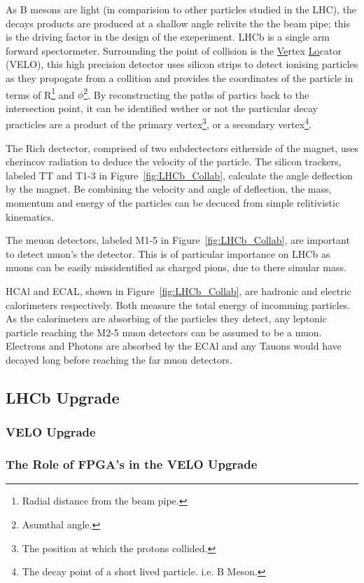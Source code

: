    As B mesons are light (in comparision to other particles studied in the LHC), the decays products are produced at a shallow angle relivite the the beam pipe;
    this is the driving factor in the design of the exeperiment. 
    LHCb is a single arm forward spectormeter.
    Surrounding the point of collision is the \underline{Ve}rtex \underline{Lo}cator (VELO), this high precision detector uses silicon strips to detect ionising particles as they propogate from a collition and provides the coordinates of the particle in terms of R\footnote{Radial distance from the beam pipe.} and $\phi$\footnote{Asumthal angle.}.
    By reconstructing the paths of partics back to the intersection point, it can be identified wether or not the particular decay practicles are a product of the primary vertex\footnote{The position at which the protons collided.}, or a secondary vertex\footnote{The decay point of a short lived particle. i.e. B Meson.}.
    \par
    The Rich dectector, comprised of two subdectectors eitherside of the magnet, uses cherincov radiation to deduce the velocity of the particle. The silicon trackers, labeled TT and T1-3 in Figure~\ref{fig:LHCb_Collab}, calculate the angle deflection by the magnet. Be combining the velocity and angle of deflection, the mass, momentum and energy of the particles can be decuced from simple relitivistic kinematics.
    \par
    The meuon detectors, labeled M1-5 in Figure~\ref{fig:LHCb_Collab}, are important to detect muon's the detector. 
    This is of particular importance on LHCb as muons can be easily missidentified as charged pions, due to there simular mass.
    \par
    HCAl and ECAL, shown in Figure~\ref{fig:LHCb_Collab}, are hadronic and electric calorimeters respectively. 
    Both measure the total energy of incomming particles.
    As the calorimeters are absorbing of the particles they detect, any leptonic particle reaching the M2-5 muon detectors can be assumed to be a muon.
    Electrons and Photons are absorbed by the ECAl and any Tauons would have decayed long before reaching the far muon detectors.

      \subsection{LHCb Upgrade} %
      \label{sub:lhcb_upgrade}


      \subsubsection{VELO Upgrade}



      \subsubsection{The Role of FPGA's in the VELO Upgrade}

      

